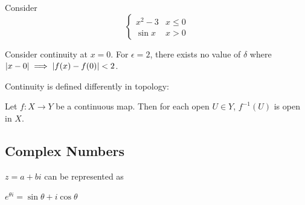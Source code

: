 \documentclass[10pt]{article}
\begin{document}
\begin{example}
Consider
\[ \begin{cases} 
      x^2 - 3 & x\leq 0 \\
			\sin x & x > 0
   \end{cases}
\]

Consider continuity at $x = 0$. For $\epsilon = 2$, there exists no value of
$\delta$ where $\lvert x - 0\rvert \implies \lvert f(x) - f(0)\rvert < 2$.
\end{example}


Continuity is defined differently in topology:

\begin{definition}
	Let $f: X \to Y$ be a continuous map. Then for each open $U\in Y$,
	$f^{-1}(U)$ is open in $X$.
\end{definition}

\subsection{Complex Numbers}


$z = a + bi$ can be represented as

$e^{\theta i} = \sin\theta + i \cos\theta$
\end{document}
